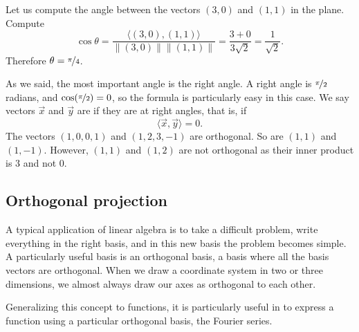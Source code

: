 \begin{myfig}
\capstart
{}
\caption{Angle between vectors.\label{vec-angle:fig}}
\end{myfig}

\begin{example}
Let us compute the angle between the vectors $(3,0)$ and $(1,1)$ in the
plane.
Compute
\begin{equation*}
\cos \theta =
\frac{\bigl\langle (3,0) , (1,1) \bigr\rangle}{\lVert(3,0)\rVert \lVert(1,1)\rVert}
=
\frac{3 + 0}{3 \sqrt{2}} = \frac{1}{\sqrt{2}} .
\end{equation*}
Therefore $\theta = \nicefrac{\pi}{4}$.
\end{example}

As we said, the most important angle is the right angle.  A right angle
is $\nicefrac{\pi}{2}$ radians, and $\cos (\nicefrac{\pi}{2}) = 0$, so the
formula is particularly easy in this case.
We say
vectors $\vec{x}$ and $\vec{y}$
are \emph{} if they are at right
angles, that is, if
\begin{equation*}
\langle \vec{x} , \vec{y} \rangle
=
0 .
\end{equation*}
The vectors $(1,0,0,1)$ and $(1,2,3,-1)$ are orthogonal.  So
are $(1,1)$ and $(1,-1)$.  However, $(1,1)$ and $(1,2)$ are not orthogonal as
their inner product is $3$ and not 0.

\subsection{Orthogonal projection}

A typical application of linear algebra is to take a difficult problem,
write everything in the right basis, and in this new basis the problem
becomes simple.  A particularly useful basis is an orthogonal basis,
a basis where all the basis vectors are orthogonal.  When we draw a
coordinate system in two or three dimensions, we almost always draw our axes
as orthogonal to each other.

Generalizing this concept to functions,
it is particularly useful in  to express a
function using a particular orthogonal basis, the Fourier series.

